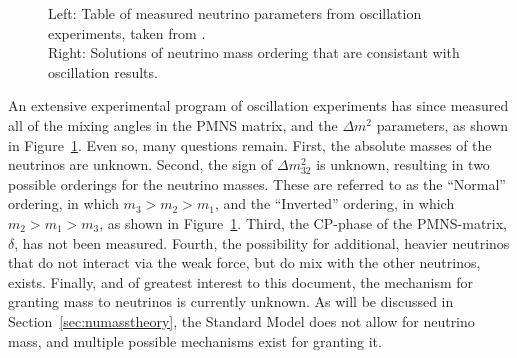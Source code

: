\documentclass[/main.tex]{subfiles}
\begin{document}
\begin{figure}[t]
  \centering
  \caption[Neutrino Oscillation Parameters and Mass Ordering]{\label{fig:massordering}
    Left: Table of measured neutrino parameters from oscillation experiments, taken from \cite{PDG2018}.\\
    Right: Solutions of neutrino mass ordering that are consistant with oscillation results.
  }
\end{figure}
An extensive experimental program of oscillation experiments has since measured all of the mixing angles in the PMNS matrix, and the $\Delta m^2$ parameters, as shown in Figure~\ref{fig:massordering}.
Even so, many questions remain.
First, the absolute masses of the neutrinos are unknown.
Second, the sign of $\Delta m^2_{32}$ is unknown, resulting in two possible orderings for the neutrino masses.
These are referred to as the ``Normal'' ordering, in which $m_3>m_2>m_1$, and the ``Inverted'' ordering, in which $m_2>m_1>m_3$, as shown in Figure~\ref{fig:massordering}.
Third, the CP-phase of the PMNS-matrix, $\delta$, has not been measured.
Fourth, the possibility for additional, heavier neutrinos that do not interact via the weak force, but do mix with the other neutrinos, exists.
Finally, and of greatest interest to this document, the mechanism for granting mass to neutrinos is currently unknown.
As will be discussed in Section~\ref{sec:numasstheory}, the Standard Model does not allow for neutrino mass, and multiple possible mechanisms exist for granting it.
\end{document}
